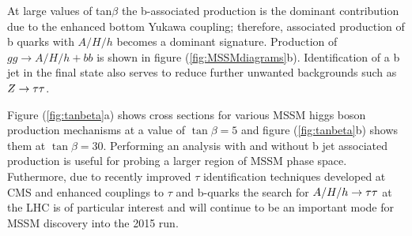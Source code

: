 At large values of tan$\beta$ 
the b-associated production is the dominant contribution due to the enhanced bottom Yukawa 
coupling; therefore, associated production of b quarks with $A/H/h$ becomes a dominant signature.
Production of $gg\rightarrow A/H/h+bb$ is shown in figure (\ref{fig:MSSMdiagrams}b). 
Identification of a b jet in the final state also serves to reduce further unwanted backgrounds
such as $Z\rightarrow \mathrm{\tau}\mathrm{\tau}$. 

Figure (\ref{fig:tanbeta}a) shows cross sections for various MSSM higgs boson 
production mechanisms at a value of $\tan\beta=5$ and figure (\ref{fig:tanbeta}b)
shows them at $\tan\beta=30$.
Performing an analysis with and without b jet associated
production is useful for probing a larger region of MSSM phase space. Futhermore, due to
recently improved 
$\tau$ identification techniques developed at CMS \cite{CMS-PAS-TAU-11-001} 
and enhanced couplings to $\tau$ and b-quarks 
the search for $A/H/h\rightarrow \mathrm{\tau}\mathrm{\tau}$ 
at the LHC is of particular interest and will continue to be an important
mode for MSSM discovery into the 2015 run.

